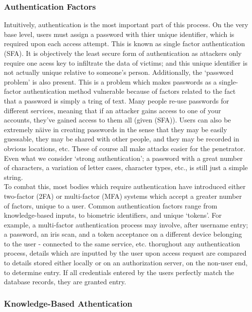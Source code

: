 \documentclass[11pt, english]{article}
\begin{document}
		\subsubsection{Authentication Factors}

	Intuitively, authentication is the most important part of this process. On the very base level, users must assign a password with thier unique identifier, which is required upon each access attempt. This is known as single factor authentication (SFA). It is objectively the least secure form of authentication as attackers only require one acess key to infiltrate the data of victims; and this unique identifier is not actually unique relative to someone's person. Additionally, the `password problem' is also present. This is a problem which makes passwords as a single-factor authentication method vulnerable because of factors related to the fact that a password is simply a tring of text. Many people re-use passwords for different services, meaning that if an attacker gains access to one of your accounts, they've gained access to them all (given (SFA)). Users can also be extremely n\"{a}ive in creating passwords in the sense that they may be easily guessable, they may be shared with other people, and they may be recorded in obvious locations, etc. These of course all make attacks easier for the penetrator. Even what we consider `strong authentication'; a password with a great number of characters, a variation of letter cases, character types, etc., is still just a simple string.\\

	To combat this, most bodies which require authentication have introduced either two-factor (2FA) or multi-factor (MFA) systems which accept a greater number of factors, unique to a user. Common authentication factors range from knowledge-based inputs, to biometric identifiers, and unique `tokens'. For example, a multi-factor authentication process may involve, after username entry; a password, an iris scan, and a token acceptance on a different device belonging to the user - connected to the same service, etc. thorughout any authentication process, details which are inputted by the user upon access request are compared to details stored either locally or on an authorization server, on the non-user end, to determine entry. If all credentials entered by the users perfectly match the database records, they are granted entry.
		
		\subsubsection{Knowledge-Based Athentication}
\end{document}
